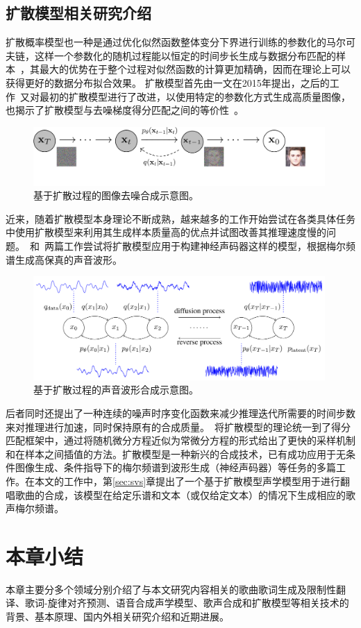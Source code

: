 \subsection{扩散模型相关研究介绍}
扩散概率模型也一种是通过优化似然函数整体变分下界进行训练的参数化的马尔可夫链，这样一个参数化的随机过程能以恒定的时间步长生成与数据分布匹配的样本~\citep{Ho2020ddpm}，其最大的优势在于整个过程对似然函数的计算更加精确，因而在理论上可以获得更好的数据分布拟合效果。
扩散模型首先由\citet{sohl2015deep}一文在2015年提出，之后的工作\citet{Ho2020ddpm}~又对最初的扩散模型进行了改进，以使用特定的参数化方式生成高质量图像，也揭示了扩散模型与去噪梯度得分匹配之间的等价性~\citep{song2019generative,song2021scorebased}。
\begin{figure}[!h]
  \includegraphics[width=0.99\textwidth]{figure/related/ddpm.pdf}
  \caption{基于扩散过程的图像去噪合成示意图\citep{Ho2020ddpm}。}
\end{figure}
近来，随着扩散模型本身理论不断成熟，越来越多的工作开始尝试在各类具体任务中使用扩散模型来利用其生成样本质量高的优点并试图改善其推理速度慢的问题。\citet{kong2021diffwave}~和\citet{chen2021wavegrad}~两篇工作尝试将扩散模型应用于构建神经声码器这样的模型，根据梅尔频谱生成高保真的声音波形。
\begin{figure}[!h]
  \includegraphics[width=0.99\textwidth]{figure/related/diffwave.png}
  \caption{基于扩散过程的声音波形合成示意图\citep{kong2021diffwave}。}
\end{figure}
后者同时还提出了一种连续的噪声时序变化函数来减少推理迭代所需要的时间步数来对推理进行加速，同时保持原有的合成质量。\citet{song2021denoising}~将扩散模型的理论统一到了得分匹配框架中，通过将随机微分方程近似为常微分方程的形式给出了更快的采样机制和在样本之间插值的方法。扩散模型是一种新兴的合成技术，已有成功应用于无条件图像生成、条件指导下的梅尔频谱到波形生成（神经声码器）等任务的多篇工作。在本文的工作中，第\ref{sec:svs}章提出了一个基于扩散模型声学模型用于进行翻唱歌曲的合成，该模型在给定乐谱和文本（或仅给定文本）的情况下生成相应的歌声梅尔频谱。
\section{本章小结}
本章主要分多个领域分别介绍了与本文研究内容相关的歌曲歌词生成及限制性翻译、歌词-旋律对齐预测、语音合成声学模型、歌声合成和扩散模型等相关技术的背景、基本原理、国内外相关研究介绍和近期进展。
